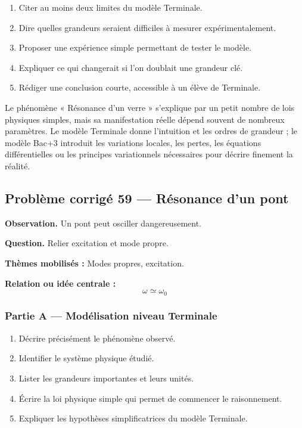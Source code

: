 \documentclass[11pt,a4paper]{article}
\begin{document}
\begin{enumerate}
  \item Citer au moins deux limites du modèle Terminale.
  \item Dire quelles grandeurs seraient difficiles à mesurer expérimentalement.
  \item Proposer une expérience simple permettant de tester le modèle.
  \item Expliquer ce qui changerait si l'on doublait une grandeur clé.
  \item Rédiger une conclusion courte, accessible à un élève de Terminale.
\end{enumerate}

\begin{corrigebox}
Le phénomène « Résonance d'un verre » s'explique par un petit nombre de lois physiques simples, mais sa manifestation réelle dépend souvent de nombreux paramètres. Le modèle Terminale donne l'intuition et les ordres de grandeur ; le modèle Bac+3 introduit les variations locales, les pertes, les équations différentielles ou les principes variationnels nécessaires pour décrire finement la réalité.
\end{corrigebox}

\subsection{Problème corrigé 59 — Résonance d'un pont}

\begin{exercicebox}
\textbf{Observation.} Un pont peut osciller dangereusement.

\medskip
\textbf{Question.} Relier excitation et mode propre.

\medskip
\textbf{Thèmes mobilisés :} Modes propres, excitation.

\medskip
\textbf{Relation ou idée centrale :}
\[
\omega\simeq\omega_0
\]
\end{exercicebox}

\subsubsection*{Partie A — Modélisation niveau Terminale}

\begin{enumerate}
  \item Décrire précisément le phénomène observé.
  \item Identifier le système physique étudié.
  \item Lister les grandeurs importantes et leurs unités.
  \item Écrire la loi physique simple qui permet de commencer le raisonnement.
  \item Expliquer les hypothèses simplificatrices du modèle Terminale.
\end{enumerate}
\end{document}
